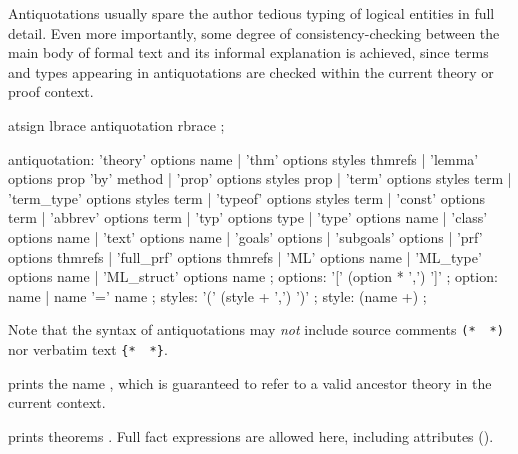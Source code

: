 \begin{isabellebody}
\begin{isamarkuptext}
  Antiquotations usually spare the author tedious typing of logical
  entities in full detail.  Even more importantly, some degree of
  consistency-checking between the main body of formal text and its
  informal explanation is achieved, since terms and types appearing in
  antiquotations are checked within the current theory or proof
  context.

  \begin{rail}
    atsign lbrace antiquotation rbrace
    ;

    antiquotation:
      'theory' options name |
      'thm' options styles thmrefs |
      'lemma' options prop 'by' method |
      'prop' options styles prop |
      'term' options styles term |
      'term_type' options styles term |
      'typeof' options styles term |
      'const' options term |
      'abbrev' options term |
      'typ' options type |
      'type' options name |
      'class' options name |
      'text' options name |
      'goals' options |
      'subgoals' options |
      'prf' options thmrefs |
      'full_prf' options thmrefs |
      'ML' options name |
      'ML_type' options name |
      'ML_struct' options name
    ;
    options: '[' (option * ',') ']'
    ;
    option: name | name '=' name
    ;
    styles: '(' (style + ',') ')'
    ;
    style: (name +)
    ;
  \end{rail}

  Note that the syntax of antiquotations may \emph{not} include source
  comments \verb|(*|~\isa{{\isachardoublequote}{\isasymdots}{\isachardoublequote}}~\verb|*)| nor verbatim
  text \verb|{|\verb|*|~\isa{{\isachardoublequote}{\isasymdots}{\isachardoublequote}}~\verb|*|\verb|}|.

  \begin{description}
  
  \item {} prints the name , which is
  guaranteed to refer to a valid ancestor theory in the current
  context.

  \item {} prints theorems .
  Full fact expressions are allowed here, including attributes
  ().


\end{description}
\end{isamarkuptext}
\end{isabellebody}
